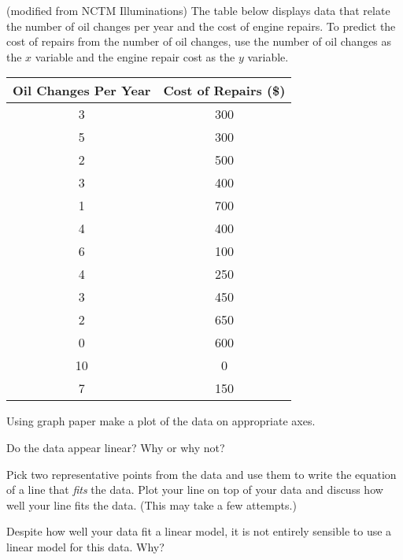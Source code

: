 \begin{exercises} 

\item (modified from NCTM Illuminations) The table below displays data that relate the number of oil changes per year and the
    cost of engine repairs.  To predict the cost of repairs from the number of oil
    changes, use the number of oil changes as the $x$ variable and the engine repair cost
    as the $y$ variable.  
    \begin{center}
        \begin{tabular}[h!]{|c|c|}
            \hline
            Oil Changes Per Year & Cost of Repairs (\$) \\ \hline \hline
            3 & 300 \\ 
            5 & 300 \\ 
            2 & 500 \\
            3 & 400 \\ 
            1 & 700 \\
            4 & 400 \\
            6 & 100 \\
            4 & 250 \\ 
            3 & 450 \\
            2 & 650 \\
            0 & 600 \\ 
            10 & 0 \\
            7 & 150 \\ \hline
        \end{tabular}
    \end{center}

    \ba
    \item Using graph paper make a plot of the data on appropriate axes.
    \item Do the data appear linear?  Why or why not?
    \item Pick two representative points from the data and use them to write the
        equation of a line that {\it fits} the data.  Plot your line on top of your data
        and discuss how well your line fits the
        data.   (This may take a few attempts.)
    \item Despite how well your data fit a linear model, it is not entirely sensible to
        use a linear model for this data.  Why?
    \ea
    
\begin{exerciseSolution}
\end{exerciseSolution}


\end{exercises}
\afterexercises
